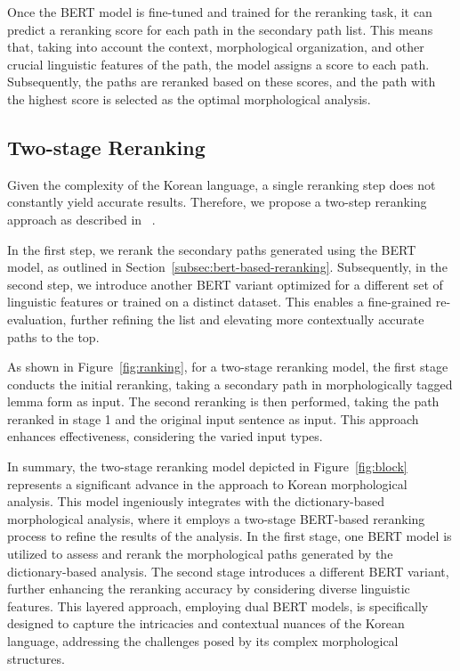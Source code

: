 \documentclass[AMS,STIX2COL]{WileyNJD-v2}
\begin{document}
    Once the BERT model is fine-tuned and trained for the reranking task, it can predict a reranking score for each path in the secondary path list.
    This means that, taking into account the context, morphological organization, and other crucial linguistic features of the path, the model assigns a score to each path.
    Subsequently, the paths are reranked based on these scores, and the path with the highest score is selected as the optimal morphological analysis.

    \subsection{Two-stage Reranking}\label{subsec:two-stage-reranking}

    Given the complexity of the Korean language, a single reranking step does not constantly yield accurate results.
    Therefore, we propose a two-step reranking approach as described in ~\cite{Nogueira2019}.

    In the first step, we rerank the secondary paths generated using the BERT model, as outlined in Section~\ref{subsec:bert-based-reranking}.
    Subsequently, in the second step, we introduce another BERT variant optimized for a different set of linguistic features or trained on a distinct dataset.
    This enables a fine-grained re-evaluation, further refining the list and elevating more contextually accurate paths to the top.

    As shown in Figure~\ref{fig:ranking}, for a two-stage reranking model, the first stage conducts the initial reranking, taking a secondary path in morphologically tagged lemma form as input.
    The second reranking is then performed, taking the path reranked in stage 1 and the original input sentence as input.
    This approach enhances effectiveness, considering the varied input types.

    In summary, the two-stage reranking model depicted in Figure~\ref{fig:block} represents a significant advance in the approach to Korean morphological analysis.
    This model ingeniously integrates with the dictionary-based morphological analysis, where it employs a two-stage BERT-based reranking process to refine the results of the analysis.
    In the first stage, one BERT model is utilized to assess and rerank the morphological paths generated by the dictionary-based analysis.
    The second stage introduces a different BERT variant, further enhancing the reranking accuracy by considering diverse linguistic features.
    This layered approach, employing dual BERT models, is specifically designed to capture the intricacies and contextual nuances of the Korean language, addressing the challenges posed by its complex morphological structures.
\end{document}
